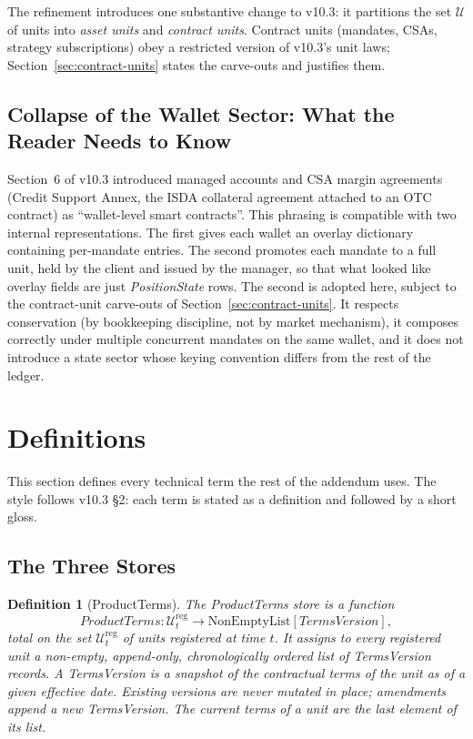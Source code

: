 \documentclass[11pt,a4paper]{article}
\newtheorem{definition}{Definition}[section]
\begin{document}
The refinement introduces one substantive change to v10.3: it partitions the set $\mathcal{U}$ of units into \emph{asset units} and \emph{contract units}. Contract units (mandates, CSAs, strategy subscriptions) obey a restricted version of v10.3's unit laws; Section~\ref{sec:contract-units} states the carve-outs and justifies them.

\subsection{Collapse of the Wallet Sector: What the Reader Needs to Know}

Section~6 of v10.3 introduced managed accounts and CSA margin agreements (Credit Support Annex, the ISDA collateral agreement attached to an OTC contract) as ``wallet-level smart contracts''. This phrasing is compatible with two internal representations. The first gives each wallet an overlay dictionary containing per-mandate entries. The second promotes each mandate to a full unit, held by the client and issued by the manager, so that what looked like overlay fields are just \textit{PositionState} rows. The second is adopted here, subject to the contract-unit carve-outs of Section~\ref{sec:contract-units}. It respects conservation (by bookkeeping discipline, not by market mechanism), it composes correctly under multiple concurrent mandates on the same wallet, and it does not introduce a state sector whose keying convention differs from the rest of the ledger.

\clearpage
\section{Definitions}
\label{sec:definitions}

This section defines every technical term the rest of the addendum uses. The style follows v10.3 \S 2: each term is stated as a definition and followed by a short gloss.

\subsection{The Three Stores}

\begin{definition}[ProductTerms]
\label{def:productterms}
The \emph{ProductTerms} store is a function
\[
\textit{ProductTerms} : \mathcal{U}_t^{\mathrm{reg}} \to \mathrm{NonEmptyList}[\textit{TermsVersion}],
\]
total on the set $\mathcal{U}_t^{\mathrm{reg}}$ of units registered at time $t$. It assigns to every registered unit a non-empty, append-only, chronologically ordered list of \textit{TermsVersion} records. A \textit{TermsVersion} is a snapshot of the contractual terms of the unit as of a given effective date. Existing versions are never mutated in place; amendments append a new \textit{TermsVersion}. The current terms of a unit are the last element of its list.
\end{definition}
\end{document}
